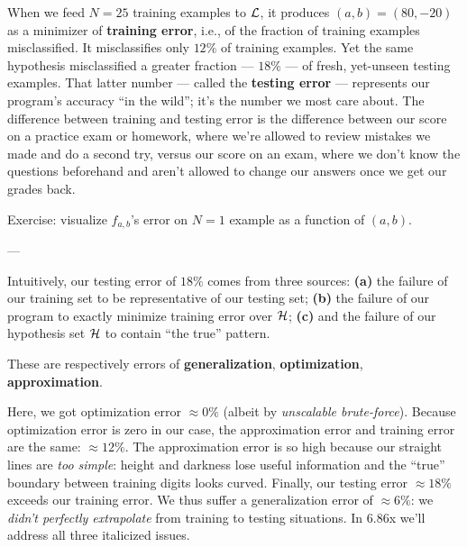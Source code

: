 \documentclass[11pt, justified]{tufte-book}
\newcommand{\attn}[1]{{\bro \textsf{#1}}}
\newcommand{\sampassage}[1]{
   \vspace{0.1cm}
   \par\noindent{\hspace{-2cm}\normalsize \sc \gre #1} ---
}
\theoremstyle{definition}
\begin{document}
        When we feed $N=25$ training examples to $\mathcal{L}$, it produces
        $(a,b)=(80,-20)$ as a minimizer of \textbf{training error}, i.e.,
        of the fraction of training examples misclassified.  It misclassifies
        only $12\%$ of training examples. Yet the same
        hypothesis misclassified a greater fraction --- $18\%$ --- of fresh,
        yet-unseen testing examples.
        That latter number --- called the \textbf{testing error} --- represents
        our program's accuracy ``in the wild'';
        it's the number we most care about.  The difference between training
        and testing error is the difference between our score on a practice
        exam or homework, where we're allowed to review mistakes we made and
        do a second try, versus our score on an exam, where we don't know the
        questions beforehand and aren't allowed to change our answers once we
        get our grades back.

        \noindent
        \attn{Exercise:} {visualize $f_{a,b}$'s error on $N=1$ example as a 
        function of $(a,b)$.}


      \sampassage{error analysis}
        Intuitively, our testing error of $18\%$ comes from three sources:
        \textbf{(a)} the failure of our training set to be representative of our testing set; 
        \textbf{(b)} the failure of our program to exactly minimize training error over $\mathcal{H}$;
        \textbf{(c)} and the failure of our hypothesis set $\mathcal{H}$ to contain ``the true'' pattern. 

        These are respectively errors of
        \textbf{generalization},
        \textbf{optimization},
        \textbf{approximation}.

        Here, we got optimization error $\approx 0\%$ (albeit by
        \emph{unscalable brute-force}).  Because optimization error is zero in
        our case, the approximation error and training error are the same:
        $\approx12\%$.  The approximation error is so high because our straight
        lines are \emph{too simple}: height and darkness lose useful
        information and the ``true'' boundary between training digits looks
        curved.
        Finally, our testing error $\approx 18\%$ exceeds our training error.
        We thus suffer a generalization error of $\approx 6\%$: we \emph{didn't
        perfectly extrapolate} from training to testing situations.
        In 6.86x we'll address all three italicized issues.
\end{document}
